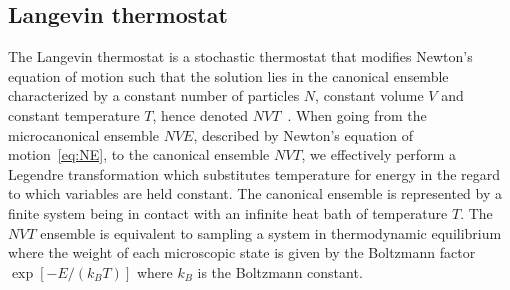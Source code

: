 \subsection{Langevin thermostat} \label{sec:langevin}




The Langevin thermostat is a stochastic thermostat that modifies Newton's
equation of motion such that the solution lies in the canonical ensemble
characterized by a constant number of particles $N$, constant volume $V$ and
constant temperature $T$, hence denoted $NVT$~\cite{Manini_2016}. When going from the microcanonical ensemble $NVE$, described by Newton's equation of motion~\cref{eq:NE}, to the canonical ensemble $NVT$, we effectively perform a Legendre transformation which substitutes temperature for energy in the regard to which variables are held constant. The canonical ensemble is represented by a finite system being in contact with an infinite heat bath of temperature $T$. The $NVT$ ensemble is equivalent to sampling a system in thermodynamic equilibrium where the weight of each microscopic state is given by the Boltzmann factor $\exp[-E/(k_B T)]$ where $k_B$ is the Boltzmann constant. 

